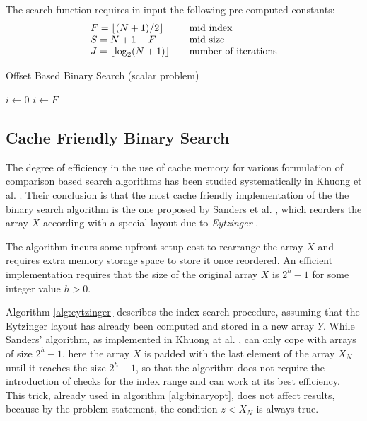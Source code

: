 \documentclass[preprint,1p,times]{elsarticle}
\begin{document}
The search function requires in input the following pre-computed constants:
$$
	\begin{array}{lll}
		F=\left \lfloor (N+1)/2 \right \rfloor & & \text{mid index}  \\
		S=N+1-F  & & \text{mid size} \\
		J=\left \lfloor \log_2(N+1) \right \rfloor & & \text{number of iterations}
	\end{array}
$$

\begin{algorithm}[ht]
	\caption{Offset Based Binary Search  (scalar problem)}
	\label{alg:naiveoffset}
	\begin{algorithmic}
		
		\State $i \leftarrow 0$
		  
			\State $i \leftarrow F$ 
		\EndIf
			 
			  
			\EndIf
		\EndWhile
		\EndFunction
	\end{algorithmic}
\end{algorithm}

\subsection{Cache Friendly Binary Search}
\label{sec:eytzinger}
The degree of efficiency in the use of cache memory for various formulation of comparison based search algorithms has been studied systematically in Khuong et al. \cite{Morin2015}. Their conclusion is that the most cache friendly implementation of the the binary search algorithm is the one proposed by Sanders et al. \cite{Sanders2004}, which reorders the array $X$ according with a special layout due to \textit{Eytzinger} \cite{Eytzinger1590}.

The algorithm incurs some upfront setup cost to rearrange the array $X$ and requires extra memory storage space to store it once reordered. An efficient implementation requires that the size of the original array $X$ is $2^h-1$ for some integer value $h>0$. 

Algorithm \ref{alg:eytzinger} describes the index search procedure, assuming that the Eytzinger layout has already been computed and stored in a new array $Y$. 
While Sanders' algorithm, as implemented in Khuong at al. \cite{Morin2015}, can only cope with arrays of size $2^h-1$, here the array $X$ is padded with the last element of the array $X_N$ until it reaches the size $2^h-1$, so that the algorithm does not require the introduction of checks for the index range and can work at its best efficiency. This trick, already used in algorithm \ref{alg:binaryopt}, does not affect results, because by the problem statement, the condition $z<X_N$ is always true.
\end{document}
